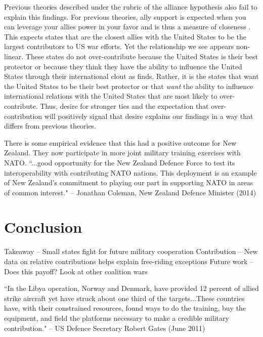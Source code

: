\documentclass[12pt,letterpaper]{article}
\begin{document}
	Previous theories described under the rubric of the alliance hypothesis also fail to explain this findings. For previous theories, ally support is expected when you can leverage your allies power in your favor and is thus a measure of closeness \citep{davidson_neoclassicalrealistexplanation_2011}. This expects states that are the closest allies with the United States to be the largest contributors to US war efforts. Yet the relationship we see appears non-linear. These states do not over-contribute because the United States is their best protector or because they think they have the ability to influence the United States through their international clout as \citet{ringsmose_natoburdensharingredux_2010} finds. Rather, it is the states that want the United States to be their best protector or that \textit{want} the ability to influence international relations with the United States that are most likely to over-contribute. Thus, desire for stronger ties and the expectation that over-contribution will positively signal that desire explains our findings in a way that differs from previous theories.

	There is some empirical evidence that this had a positive outcome for New Zealand. They now participate in more joint military training exercises with NATO. ``...good opportunity for the New Zealand Defence Force to test its interoperability with contributing NATO nations. This deployment is an example of New Zealand's commitment to playing our part in supporting NATO in areas of common interest." -- Jonathan Coleman, New Zealand Defence Minister (2014)

\section{Conclusion}
	Takeaway -- Small states fight for future military cooperation
	Contribution -- New data on relative contributions helps explain free-riding exceptions
	Future work -- Does this payoff? Look at other coalition wars

	``In the Libya operation, Norway and Denmark, have provided 12 percent of allied strike aircraft yet have struck about one third of the targets...These countries have, with their constrained resources, found ways to do the training, buy the equipment, and field the platforms necessary to make a credible military contribution." -- US Defence Secretary Robert Gates (June 2011)



\end{document}
